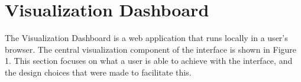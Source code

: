 \documentclass{sigchi}
\begin{document}
%
%
%
%
%
%
%
%



\section{Visualization Dashboard}
The Visualization Dashboard is a web application that runs locally in a user's browser. %
%
The central visualization component of the interface is shown in Figure 1. %
%
This section focuses on what a user is able to achieve with the interface, and the design choices that were made to facilitate this. %
%
\end{document}
